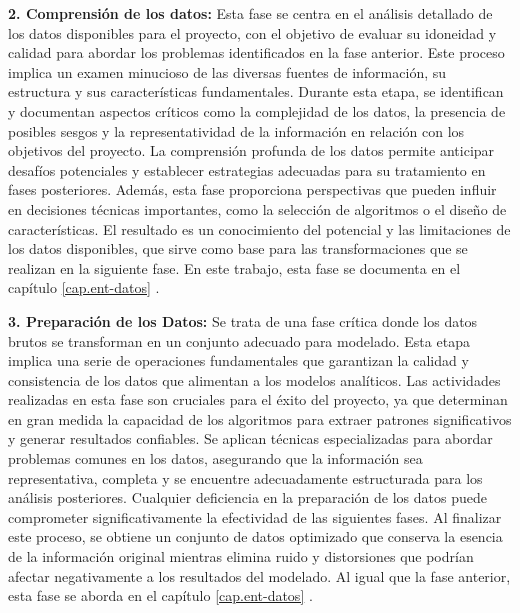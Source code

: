 \textbf{2. Comprensión de los datos:} Esta fase se centra en el análisis detallado de los datos disponibles para el proyecto, con el objetivo de evaluar su idoneidad y calidad para abordar los problemas identificados en la fase anterior. Este proceso implica un examen minucioso de las diversas fuentes de información, su estructura y sus características fundamentales. Durante esta etapa, se identifican y documentan aspectos críticos como la complejidad de los datos, la presencia de posibles sesgos y la representatividad de la información en relación con los objetivos del proyecto. La comprensión profunda de los datos permite anticipar desafíos potenciales y establecer estrategias adecuadas para su tratamiento en fases posteriores. Además, esta fase proporciona perspectivas que pueden influir en decisiones técnicas importantes, como la selección de algoritmos o el diseño de características. El resultado es un conocimiento del potencial y las limitaciones de los datos disponibles, que sirve como base para las transformaciones que se realizan en la siguiente fase. En este trabajo, esta fase se documenta en el capítulo \ref{cap.ent-datos} .

\textbf{3. Preparación de los Datos:} Se trata de una fase crítica donde los datos brutos se transforman en un conjunto adecuado para modelado. Esta etapa implica una serie de operaciones fundamentales que garantizan la calidad y consistencia de los datos que alimentan a los modelos analíticos. Las actividades realizadas en esta fase son cruciales para el éxito del proyecto, ya que determinan en gran medida la capacidad de los algoritmos para extraer patrones significativos y generar resultados confiables. Se aplican técnicas especializadas para abordar problemas comunes en los datos, asegurando que la información sea representativa, completa y se encuentre adecuadamente estructurada para los análisis posteriores. Cualquier deficiencia en la preparación de los datos puede comprometer significativamente la efectividad de las siguientes fases. Al finalizar este proceso, se obtiene un conjunto de datos optimizado que conserva la esencia de la información original mientras elimina ruido y distorsiones que podrían afectar negativamente a los resultados del modelado. Al igual que la fase anterior, esta fase se aborda en el capítulo \ref{cap.ent-datos} .


